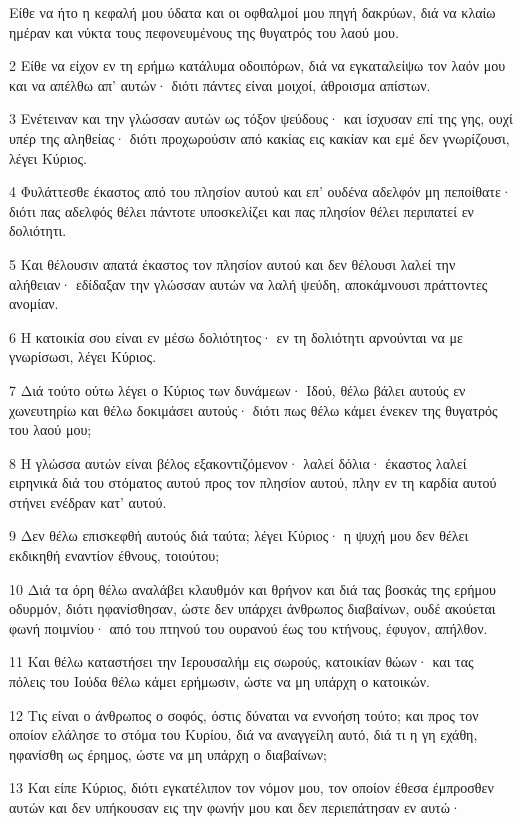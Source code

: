 \par Είθε να ήτο η κεφαλή μου ύδατα και οι οφθαλμοί μου πηγή δακρύων, διά να κλαίω ημέραν και νύκτα τους πεφονευμένους της θυγατρός του λαού μου.
\par 2 Είθε να είχον εν τη ερήμω κατάλυμα οδοιπόρων, διά να εγκαταλείψω τον λαόν μου και να απέλθω απ' αυτών· διότι πάντες είναι μοιχοί, άθροισμα απίστων.
\par 3 Ενέτειναν και την γλώσσαν αυτών ως τόξον ψεύδους· και ίσχυσαν επί της γης, ουχί υπέρ της αληθείας· διότι προχωρούσιν από κακίας εις κακίαν και εμέ δεν γνωρίζουσι, λέγει Κύριος.
\par 4 Φυλάττεσθε έκαστος από του πλησίον αυτού και επ' ουδένα αδελφόν μη πεποίθατε· διότι πας αδελφός θέλει πάντοτε υποσκελίζει και πας πλησίον θέλει περιπατεί εν δολιότητι.
\par 5 Και θέλουσιν απατά έκαστος τον πλησίον αυτού και δεν θέλουσι λαλεί την αλήθειαν· εδίδαξαν την γλώσσαν αυτών να λαλή ψεύδη, αποκάμνουσι πράττοντες ανομίαν.
\par 6 Η κατοικία σου είναι εν μέσω δολιότητος· εν τη δολιότητι αρνούνται να με γνωρίσωσι, λέγει Κύριος.
\par 7 Διά τούτο ούτω λέγει ο Κύριος των δυνάμεων· Ιδού, θέλω βάλει αυτούς εν χωνευτηρίω και θέλω δοκιμάσει αυτούς· διότι πως θέλω κάμει ένεκεν της θυγατρός του λαού μου;
\par 8 Η γλώσσα αυτών είναι βέλος εξακοντιζόμενον· λαλεί δόλια· έκαστος λαλεί ειρηνικά διά του στόματος αυτού προς τον πλησίον αυτού, πλην εν τη καρδία αυτού στήνει ενέδραν κατ' αυτού.
\par 9 Δεν θέλω επισκεφθή αυτούς διά ταύτα; λέγει Κύριος· η ψυχή μου δεν θέλει εκδικηθή εναντίον έθνους, τοιούτου;
\par 10 Διά τα όρη θέλω αναλάβει κλαυθμόν και θρήνον και διά τας βοσκάς της ερήμου οδυρμόν, διότι ηφανίσθησαν, ώστε δεν υπάρχει άνθρωπος διαβαίνων, ουδέ ακούεται φωνή ποιμνίου· από του πτηνού του ουρανού έως του κτήνους, έφυγον, απήλθον.
\par 11 Και θέλω καταστήσει την Ιερουσαλήμ εις σωρούς, κατοικίαν θώων· και τας πόλεις του Ιούδα θέλω κάμει ερήμωσιν, ώστε να μη υπάρχη ο κατοικών.
\par 12 Τις είναι ο άνθρωπος ο σοφός, όστις δύναται να εννοήση τούτο; και προς τον οποίον ελάλησε το στόμα του Κυρίου, διά να αναγγείλη αυτό, διά τι η γη εχάθη, ηφανίσθη ως έρημος, ώστε να μη υπάρχη ο διαβαίνων;
\par 13 Και είπε Κύριος, διότι εγκατέλιπον τον νόμον μου, τον οποίον έθεσα έμπροσθεν αυτών και δεν υπήκουσαν εις την φωνήν μου και δεν περιεπάτησαν εν αυτώ·
